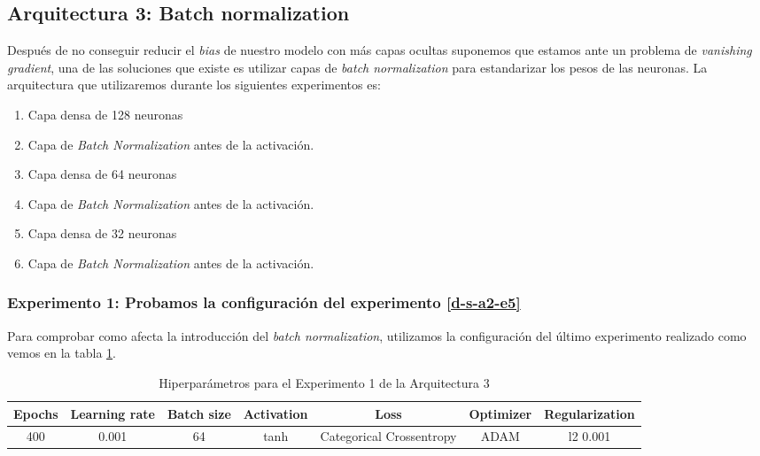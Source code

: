 \documentclass{article}
\begin{document}
	\subsection{Arquitectura 3: Batch normalization}
	\label{d-s-a3}
		Despu\'es de no conseguir reducir el \textit{bias} de nuestro modelo con m\'as capas ocultas suponemos que estamos ante un problema de \textit{vanishing gradient}, una de las soluciones que existe es utilizar capas de \textit{batch normalization} para estandarizar los pesos de las neuronas. La arquitectura que utilizaremos durante los siguientes experimentos es:
		\begin{enumerate}
			\item Capa densa de 128 neuronas
			\item Capa de \textit{Batch Normalization} antes de la activaci\'on.
			\item Capa densa de 64 neuronas
			\item Capa de \textit{Batch Normalization} antes de la activaci\'on.
			\item Capa densa de 32 neuronas
			\item Capa de \textit{Batch Normalization} antes de la activaci\'on.
		\end{enumerate}
		
		\subsubsection{Experimento 1: Probamos la configuraci\'on del experimento \ref{d-s-a2-e5}}
		\label{d-s-a3-e1}
			Para comprobar como afecta la introducci\'on del \textit{batch normalization}, utilizamos la configuraci\'on del \'ultimo experimento realizado como vemos en la tabla \ref{tab:hip-d-a3-e1}.
			
			\begin{table}[!h]
				\begin{tabular}{| c | c | c | c | c | c | c |}
					\textbf{Epochs} & \textbf{Learning rate} & \textbf{Batch size} & \textbf{Activation} & \textbf{Loss} & \textbf{Optimizer} & \textbf{Regularization} \\ \hline
					400 & 0.001 & 64 & tanh & Categorical Crossentropy & ADAM & l2 0.001
				\end{tabular}
				\caption{Hiperpar\'ametros para el Experimento 1 de la Arquitectura 3}
				\label{tab:hip-d-a3-e1}
			\end{table}
			
\end{document}
